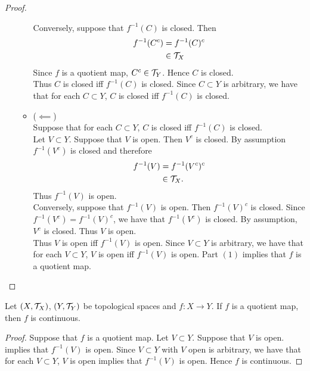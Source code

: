 \documentclass{book}
\begin{document}
\begin{proof}
\begin{enumerate}
\begin{itemize}
				Conversely, suppose that $f^{-1}(C)$ is closed. Then 
				\begin{align*}
					f^{-1}(C^c) 
					& = f^{-1}(C)^c \\
					& \in \mathcal{T}_X 
				\end{align*}
				Since $f$ is a quotient map, $C^c \in \mathcal{T}_Y$. Hence $C$ is closed. \\
				Thus $C$ is closed iff $f^{-1}(C)$ is closed. Since $C \subset Y$ is arbitrary, we have that for each $C \subset Y$, $C$ is closed iff $f^{-1}(C)$ is closed.
				\item ($\impliedby$) \\
				Suppose that for each $C \subset Y$, $C$ is closed iff $f^{-1}(C)$ is closed. \\
				Let $V \subset Y$. Suppose that $V$ is open. Then $V^c$ is closed. By assumption $f^{-1}(V^c)$ is closed and therefore
				\begin{align*}
					f^{-1}(V)
					& = f^{-1}(V^c)^c \\
					& \in \mathcal{T}_X. 
				\end{align*}
				Thus $f^{-1}(V)$ is open. \\
				Conversely, suppose that $f^{-1}(V)$ is open. Then $f^{-1}(V)^c$ is closed. Since $f^{-1}(V^c) = f^{-1}(V)^c$, we have that $f^{-1}(V^c)$ is closed. By assumption, $V^c$ is closed. Thus $V$ is open. \\
				Thus $V$ is open iff $f^{-1}(V)$ is open. Since $V \subset Y$ is arbitrary, we have that for each $V \subset Y$, $V$ is open iff $f^{-1}(V)$ is open. Part $(1)$ implies that $f$ is a quotient map.
			\end{itemize}
		\end{enumerate}
	\end{proof}
	
	\begin{ex} 
	Let $(X, \mathcal{T}_X)$, $(Y, \mathcal{T}_Y)$ be topological spaces and $f:X \rightarrow Y$. If $f$ is a quotient map, then $f$ is continuous.
	\end{ex}
	
	\begin{proof}
	Suppose that $f$ is a quotient map. Let $V \subset Y$. Suppose that $V$ is open.  implies that $f^{-1}(V)$ is open. Since $V \subset Y$ with $V$ open is arbitrary, we have that for each $V \subset Y$, $V$ is open implies that $f^{-1}(V)$ is open. Hence $f$ is continuous.  
	\end{proof}
\end{document}
